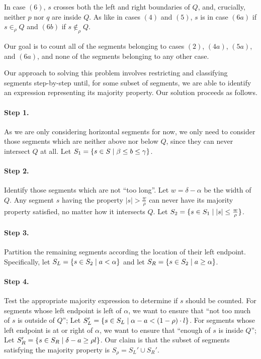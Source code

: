 In case $(6)$, $s$ crosses both the left and right boundaries of $Q$, and, crucially, neither $p$ nor $q$ are inside $Q$. As like in cases $(4)$ and $(5)$, $s$ is in case $(6a)$ if $s \in_\rho Q$ and $(6b)$ if $s \not \in_\rho Q$.

Our goal is to count all of the segments belonging to cases $(2)$, $(4a)$, $(5a)$, and $(6a)$, and none of the segments belonging to any other case.

Our approach to solving this problem involves restricting and classifying segments step-by-step until, for some subset of segments, we are able to identify an expression representing its majority property.  Our solution proceeds as follows.

\paragraph{Step 1.} As we are only considering horizontal segments for now, we only need to consider those segments which are neither above nor below $Q$, since they can never intersect $Q$ at all. Let $S_1 = \{ s \in S \;|\; \beta \leq b \leq \gamma\}$. 

\paragraph{Step 2.} Identify those segments which are not ``too long''.  Let $w = \delta - \alpha$ be the width of $Q$.  Any segment $s$ having the property $|s| > \frac{w}{\rho}$ can never have its majority property satisfied, no matter how it intersects $Q$.  Let $S_2 = \{ s \in S_1 \;|\; |s| \leq \frac{w}{\rho} \}$.

\paragraph{Step 3.} Partition the remaining segments according the location of their left endpoint.  Specifically, let $S_L = \{s \in S_2 \;|\; a < \alpha \}$ and let $S_R = \{ s \in S_2 \;|\; a \geq \alpha \}$.

\paragraph{Step 4.} Test the appropriate majority expression to determine if $s$ should be counted. For segments whose left endpoint is left of $\alpha$, we want to ensure that ``not too much of $s$ is outside of $Q$''; Let $S_L' = \{ s \in S_L \;|\; \alpha - a < (1 - \rho) \cdot l\}$. For segments whose left endpoint is at or right of $\alpha$, we want to ensure that ``enough of $s$ is inside $Q$''; Let $S_R' = \{ s \in S_R \;|\; \delta - a \geq  \rho l \}$. Our claim is that the subset of segments satisfying the majority property is $S_\rho = S_L' \cup S_R'$. 

